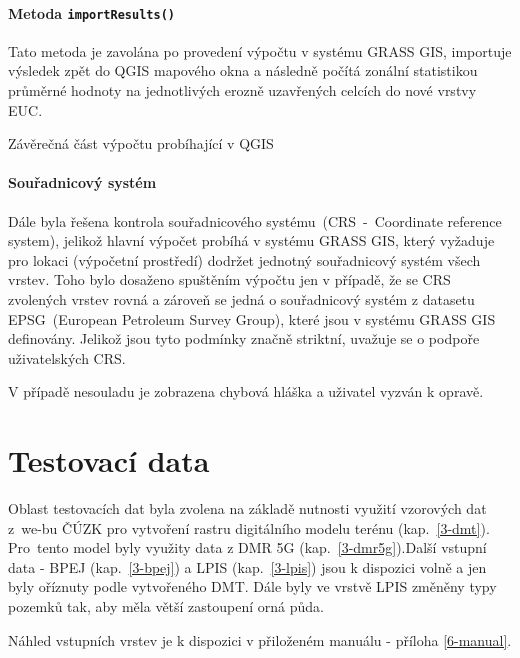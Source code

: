 \paragraph{Metoda \texttt{importResults()}} Tato metoda je zavolána po
provedení výpočtu v systému GRASS GIS, importuje výsledek zpět do QGIS mapového
okna a následně počítá zonální statistikou průměrné hodnoty na
jednotlivých erozně uzavřených celcích do nové vrstvy EUC.
\begin{algorithm}
\caption{Závěrečná část výpočtu probíhající v QGIS}
\label{alg:onAddKFactor}
    \begin{algorithmic}[1] 
   
    \end{algorithmic}
\end{algorithm}

\paragraph{Souřadnicový systém} Dále byla řešena kontrola
souřadnicového systému~(CRS~-~Coordinate reference system), jelikož
hlavní výpočet probíhá v systému GRASS GIS, který vyžaduje pro lokaci
(výpočetní prostředí) dodržet jednotný souřadnicový systém všech
vrstev. Toho bylo dosaženo spuštěním výpočtu jen v případě, že se CRS
zvolených vrstev rovná a zároveň se jedná o souřadnicový systém z datasetu
EPSG~(European Petroleum Survey Group), které jsou v systému GRASS GIS
definovány. Jelikož jsou tyto podmínky značně striktní, uvažuje se o 
podpoře uživatelských CRS.

V případě nesouladu je zobrazena chybová hláška a uživatel vyzván k
opravě.

\section{Testovací data} Oblast testovacích dat byla zvolena na
základě nutnosti využití vzorových dat z~we-bu ČÚZK\cite{cuzk} pro vytvoření rastru
digitálního modelu terénu (kap.~\ref{3-dmt}). Pro~tento model byly využity data
z DMR 5G (kap.~\ref{3-dmr5g}).Další vstupní data - BPEJ (kap.~\ref{3-bpej}) a LPIS (kap.~\ref{3-lpis}) jsou k
dispozici volně a jen byly oříznuty podle vytvořeného DMT. Dále byly
ve vrstvě LPIS změněny typy pozemků tak, aby měla větší zastoupení
orná půda.

Náhled vstupních vrstev je k dispozici v přiloženém manuálu - příloha \ref{6-manual}.
